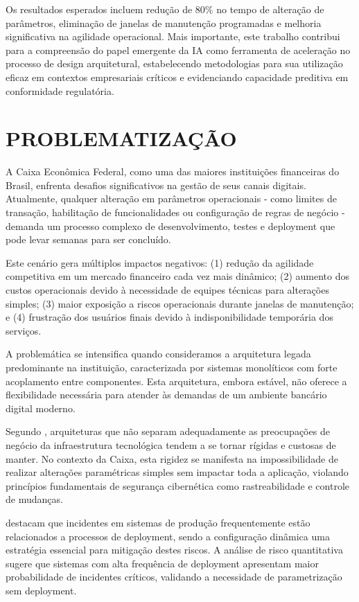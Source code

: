 Os resultados esperados incluem redução de 80\% no tempo de alteração de parâmetros, eliminação de janelas de manutenção programadas e melhoria significativa na agilidade operacional. Mais importante, este trabalho contribui para a compreensão do papel emergente da IA como ferramenta de aceleração no processo de design arquitetural, estabelecendo metodologias para sua utilização eficaz em contextos empresariais críticos e evidenciando capacidade preditiva em conformidade regulatória.

\chapter{PROBLEMATIZAÇÃO}

A Caixa Econômica Federal, como uma das maiores instituições financeiras do Brasil, enfrenta desafios significativos na gestão de seus canais digitais. Atualmente, qualquer alteração em parâmetros operacionais - como limites de transação, habilitação de funcionalidades ou configuração de regras de negócio - demanda um processo complexo de desenvolvimento, testes e deployment que pode levar semanas para ser concluído.

Este cenário gera múltiplos impactos negativos: (1) redução da agilidade competitiva em um mercado financeiro cada vez mais dinâmico; (2) aumento dos custos operacionais devido à necessidade de equipes técnicas para alterações simples; (3) maior exposição a riscos operacionais durante janelas de manutenção; e (4) frustração dos usuários finais devido à indisponibilidade temporária dos serviços.

A problemática se intensifica quando consideramos a arquitetura legada predominante na instituição, caracterizada por sistemas monolíticos com forte acoplamento entre componentes. Esta arquitetura, embora estável, não oferece a flexibilidade necessária para atender às demandas de um ambiente bancário digital moderno.

Segundo , arquiteturas que não separam adequadamente as preocupações de negócio da infraestrutura tecnológica tendem a se tornar rígidas e custosas de manter. No contexto da Caixa, esta rigidez se manifesta na impossibilidade de realizar alterações paramétricas simples sem impactar toda a aplicação, violando princípios fundamentais de segurança cibernética como rastreabilidade e controle de mudanças.

 destacam que incidentes em sistemas de produção frequentemente estão relacionados a processos de deployment, sendo a configuração dinâmica uma estratégia essencial para mitigação destes riscos. A análise de risco quantitativa sugere que sistemas com alta frequência de deployment apresentam maior probabilidade de incidentes críticos, validando a necessidade de parametrização sem deployment.

